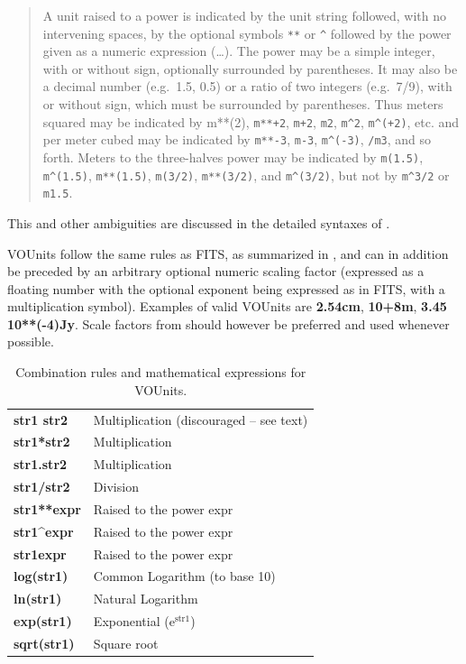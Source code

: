 \documentclass[11pt,notitlepage,onecolumn]{ivoa}
\def\eg{e.g.~}
\newcommand{\unit}[1]{\textbf{\textsf{\color{orange}#1}}}
\begin{document}
\begin{quote}
A unit raised to a power is indicated by the unit string followed,
with no intervening spaces, by the optional symbols \texttt{**}
or \texttt{\^{}} followed by the power given as a numeric expression (\dots). 
The power may be a simple integer, with or
without sign, optionally surrounded by parentheses. It may also
be a decimal number (\eg 1.5, 0.5) or a ratio of two integers
(\eg 7/9), with or without sign, which must be surrounded by
parentheses. Thus meters squared may be indicated by m**(2),
\texttt{m**+2}, \texttt{m+2}, \texttt{m2}, \texttt{m\^{}2}, \texttt{m\^{}(+2)}, etc. and per meter cubed may be
indicated by \texttt{m**-3}, \texttt{m-3}, \texttt{m\^{}(-3)}, \texttt{/m3}, and so forth. Meters to
the three-halves power may be indicated by \texttt{m(1.5)}, \texttt{m\^{}(1.5)},
\texttt{m**(1.5)}, \texttt{m(3/2)}, \texttt{m**(3/2)}, and \texttt{m\^{}(3/2)}, but not by \texttt{m\^{}3/2}
or \texttt{m1.5}.~\cite[\S4.3.1]{pence10}
\end{quote}

This and other ambiguities are discussed in the detailed syntaxes of .

VOUnits follow the same rules as FITS, as summarized in , and can in
addition be preceded by an arbitrary optional numeric scaling factor (expressed as a floating number with the optional
exponent being expressed as in FITS, with a multiplication symbol).
Examples of valid VOUnits are \unit{2.54cm}, \unit{10+8m}, \unit{3.45 10**(-4)Jy}. 
Scale factors from  should however be
preferred and used whenever possible.

\begin{table}[ht]
\begin{center}
\begin{tabular}{|l|l|}
\hline
\unit{str1 str2} & Multiplication (discouraged -- see text)\\
\unit{str1*str2} & Multiplication \\
\unit{str1.str2} & Multiplication \\
\unit{str1/str2} & Division \\
\unit{str1**expr} & Raised to the power expr \\
\unit{str1\^{}expr} & Raised to the power expr \\
\unit{str1expr} & Raised to the power expr \\
\unit{log(str1)} & Common Logarithm (to base 10) \\
\unit{ln(str1)} & Natural Logarithm \\
\unit{exp(str1)} & Exponential (e$^\mathrm{str1}$) \\
\unit{sqrt(str1)} & Square root \\
\hline
\end{tabular}
\end{center}
 \caption{Combination rules and mathematical expressions for VOUnits.}
  \label{tab:VOUnitCombine}
\end{table}
\end{document}
